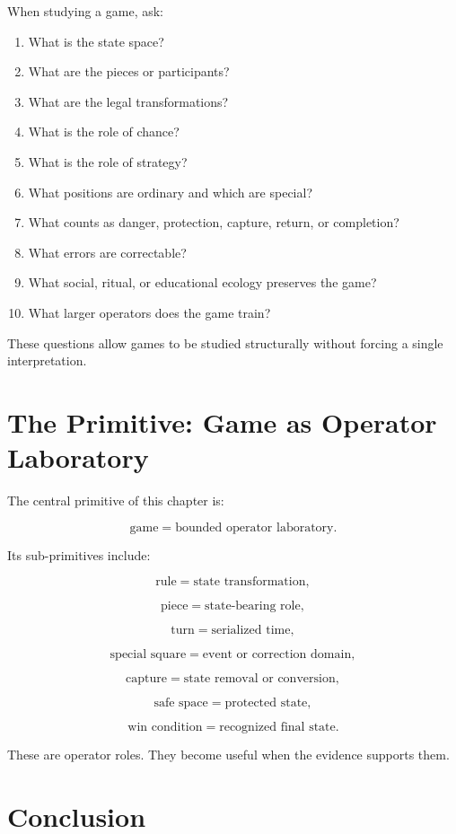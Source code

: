 \documentclass[11pt]{book}
\begin{document}
When studying a game, ask:

\begin{enumerate}[label=\arabic*.]
    \item What is the state space?
    \item What are the pieces or participants?
    \item What are the legal transformations?
    \item What is the role of chance?
    \item What is the role of strategy?
    \item What positions are ordinary and which are special?
    \item What counts as danger, protection, capture, return, or completion?
    \item What errors are correctable?
    \item What social, ritual, or educational ecology preserves the game?
    \item What larger operators does the game train?
\end{enumerate}

These questions allow games to be studied structurally without forcing a single interpretation.

\section{The Primitive: Game as Operator Laboratory}

The central primitive of this chapter is:

\[
\text{game} = \text{bounded operator laboratory}.
\]

Its sub-primitives include:

\[
\text{rule} = \text{state transformation},
\]

\[
\text{piece} = \text{state-bearing role},
\]

\[
\text{turn} = \text{serialized time},
\]

\[
\text{special square} = \text{event or correction domain},
\]

\[
\text{capture} = \text{state removal or conversion},
\]

\[
\text{safe space} = \text{protected state},
\]

\[
\text{win condition} = \text{recognized final state}.
\]

These are operator roles. They become useful when the evidence supports them.

\section{Conclusion}
\end{document}

